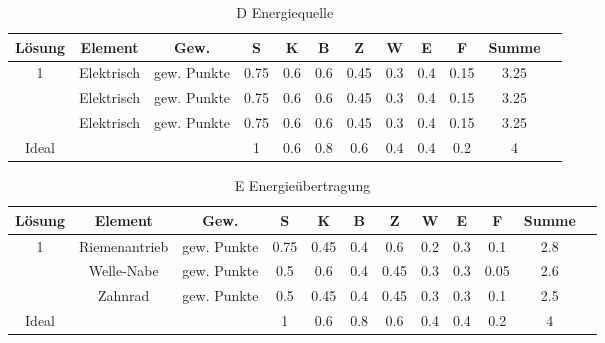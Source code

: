 \documentclass[10pt,a4paper]{article}
\begin{document}
\begin{table}[h!]
    \centering
    \begin{tabular}{cccccccccccc}
        \toprule
        \textbf{Lösung} & \textbf{Element} & \textbf{Gew.} & \textbf{S} & \textbf{K} & \textbf{B} & \textbf{Z} & \textbf{W} & \textbf{E} & \textbf{F} & \textbf{Summe} & \\
        \midrule
        1               & Elektrisch       & gew. Punkte   & 0.75       & 0.6        & 0.6        & 0.45       & 0.3        & 0.4        & 0.15       & 3.25             \\
        \addlinespace
        2               & Elektrisch       & gew. Punkte   & 0.75       & 0.6        & 0.6        & 0.45       & 0.3        & 0.4        & 0.15       & 3.25             \\
        \addlinespace
        3               & Elektrisch       & gew. Punkte   & 0.75       & 0.6        & 0.6        & 0.45       & 0.3        & 0.4        & 0.15       & 3.25             \\
        \midrule
        Ideal           &                  &               & 1          & 0.6        & 0.8        & 0.6        & 0.4        & 0.4        & 0.2        & 4                \\
        \bottomrule
    \end{tabular}
    \caption{D Energiequelle}
    \label{tab:energiequelle}
\end{table}

\begin{table}[h!]
    \centering
    \begin{tabular}{cccccccccccc}
        \toprule
        \textbf{Lösung} & \textbf{Element} & \textbf{Gew.} & \textbf{S} & \textbf{K} & \textbf{B} & \textbf{Z} & \textbf{W} & \textbf{E} & \textbf{F} & \textbf{Summe} & \\
        \midrule
        1               & Riemenantrieb    & gew. Punkte   & 0.75       & 0.45       & 0.4        & 0.6        & 0.2        & 0.3        & 0.1        & 2.8              \\
        \addlinespace
        2               & Welle-Nabe       & gew. Punkte   & 0.5        & 0.6        & 0.4        & 0.45       & 0.3        & 0.3        & 0.05       & 2.6              \\
        \addlinespace
        3               & Zahnrad          & gew. Punkte   & 0.5        & 0.45       & 0.4        & 0.45       & 0.3        & 0.3        & 0.1        & 2.5              \\
        \midrule
        Ideal           &                  &               & 1          & 0.6        & 0.8        & 0.6        & 0.4        & 0.4        & 0.2        & 4                \\
        \bottomrule
    \end{tabular}
    \caption{E Energieübertragung}
    \label{tab:energieuebertragung}
\end{table}
\end{document}

